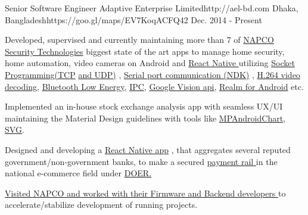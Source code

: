 

\begin{workentries}

\workentry
{Senior Software Engineer} %
{Adaptive Enterprise Limited}{http://ael-bd.com} %
{Dhaka, Bangladesh}{https://goo.gl/maps/EV7KoqACFQ42} %
{Dec. 2014 - Present} %
{
  \begin{workitems} %
    \item {Developed, supervised and currently maintaining more than 7 of
    {\href{http://www.napcosecurity.com}{NAPCO Security Technologies}}
    biggest state of the art apps to manage home security, home automation, video cameras on Android and 
    {\href{https://facebook.github.io/react-native/}{React Native }}
    utilizing 
    {\href{https://www.geeksforgeeks.org/socket-programming-in-java/}{Socket Programming(TCP}}
    {\href{https://www.geeksforgeeks.org/working-udp-datagramsockets-java/}{and UDP)}}
    , 
    {\href{https://github.com/cepr/android-serialport-api/tree/master/android-serialport-api/project}{Serial port communication (NDK)}}
    , 
    {\href{https://ieeexplore.ieee.org/document/1410457}{H.264 video decoding}}, 
    {\href{https://en.wikipedia.org/wiki/Bluetooth_Low_Energy}{Bluetooth Low Energy}}, 
    {\href{https://developer.android.com/guide/components/aidl}{IPC}}, 
    {\href{https://developers.google.com/vision/}{Google Vision api}}, 
    {\href{https://realm.io}{Realm for Android}}
    etc.}
    \item {Implemented an in-house stock exchange analysis app with seamless UX/UI maintaining the Material Design guidelines with tools like
    {\href{https://github.com/PhilJay/MPAndroidChart}{MPAndroidChart}},
    {\href{https://www.sitepoint.com/svg-101-what-is-svg/}{SVG}.}
    }
    \item {Designed and developing a 
    {\href{https://facebook.github.io/react-native/}{React Native app}}
    , that aggregates several reputed government/non-government banks, to make a secured 
    {\href{https://www.paymentrails.com}{payment rail }}
    in the national 
    e-commerce field under 
    {\href{http://doer.com.bd}{DOER.}}
    }
    \item {\href{https://drive.google.com/open?id=1j3ffYnrOgq29SupVo5lvn_BiN_UI0ly_}{Visited NAPCO and worked with their Firmware and Backend developers }
    to accelerate/stabilize development of running projects.}
  \end{workitems}
}


\end{workentries}
